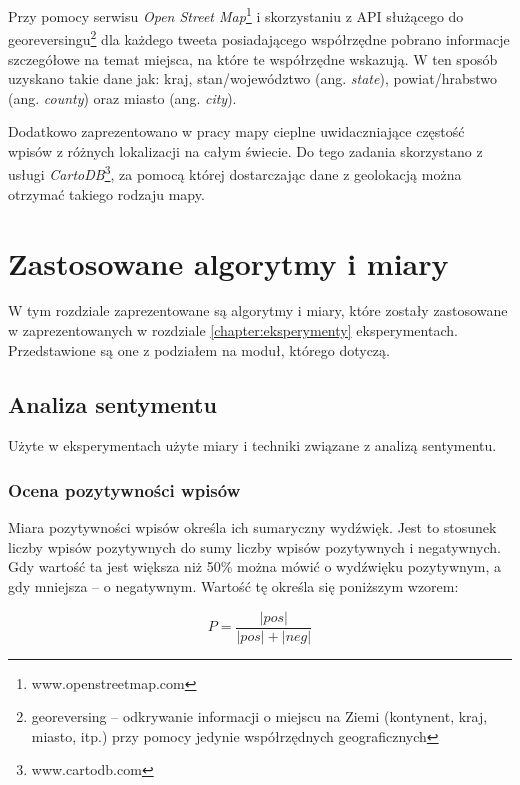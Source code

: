 Przy pomocy serwisu \textit{Open Street Map}\footnote{www.openstreetmap.com} i
skorzystaniu z API służącego do georeversingu\footnote{georeversing
 -- odkrywanie informacji o miejscu na Ziemi
(kontynent, kraj, miasto, itp.) przy pomocy jedynie współrzędnych
geograficznych} dla każdego tweeta
posiadającego współrzędne pobrano informacje szczegółowe na temat miejsca, na które te
współrzędne wskazują. W ten sposób uzyskano takie dane jak: kraj,
stan/województwo (ang. \textit{state}), powiat/hrabstwo (ang. \textit{county})
oraz miasto (ang. \textit{city}).

Dodatkowo zaprezentowano w pracy mapy cieplne uwidaczniające częstość wpisów z
różnych lokalizacji na całym świecie. Do tego zadania skorzystano z usługi
\textit{CartoDB}\footnote{www.cartodb.com}, za pomocą której dostarczając dane
z geolokacją można otrzymać takiego rodzaju mapy.




\section{Zastosowane algorytmy i miary}
\label{section:wielkosciwykorzystywane}
W tym rozdziale zaprezentowane są algorytmy i miary, które zostały zastosowane w
zaprezentowanych w rozdziale \ref{chapter:eksperymenty} eksperymentach.
Przedstawione są one z podziałem na moduł, którego dotyczą.

\subsection{Analiza sentymentu}
Użyte w eksperymentach użyte miary i techniki związane z analizą sentymentu.

\subsubsection{Ocena pozytywności wpisów}
\label{subsection:ocenapozytywnosci}
Miara pozytywności wpisów określa ich sumaryczny wydźwięk. Jest to stosunek
liczby wpisów pozytywnych do sumy liczby wpisów pozytywnych i negatywnych. Gdy
wartość ta jest większa niż 50\% można mówić o wydźwięku pozytywnym, a gdy
mniejsza -- o negatywnym. Wartość tę określa się poniższym wzorem: 

\begin{equation}
\label{equation:pozytywnosc}
P = \frac{|pos|}{|pos| + |neg|}
\end{equation}

